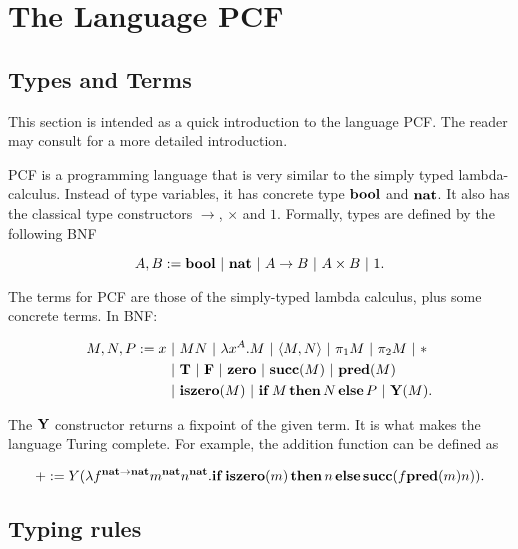 \section{The Language PCF}

\subsection{Types and Terms}

This section is intended as a quick introduction to the language PCF. The reader may consult \cite{LambdaNotes} for a more detailed introduction.

PCF is a programming language that is very similar to the simply typed lambda-calculus. Instead of type variables, it has concrete type $\mathbf{bool}$ and $\mathbf{nat}$. It also has the classical type constructors $\to$, $\times$ and $1$. Formally, types are defined by the following BNF

\[ A, B := \mathbf{bool} \ \mathbf{|}\  \mathbf{nat} \ \mathbf{|}\  A\to B \ \mathbf{|}\  A\times B \ \mathbf{|}\  1. \]

The terms for PCF are those of the simply-typed lambda calculus, plus some concrete terms. In BNF:

\begin{align*}
    M, N, P := x &\ \mathbf{|}\  MN \ \mathbf{|}\  \lambda x^A.M \ \mathbf{|}\  \langle M, N\rangle \ \mathbf{|}\  \pi_1M \ \mathbf{|}\  \pi_2M \ \mathbf{|}\  * \\
    &\ \mathbf{|}\  \mathbf{T} \ \mathbf{|}\  \mathbf{F} \ \mathbf{|}\  \mathbf{zero} \ \mathbf{|}\  \mathbf{succ}(M) \ \mathbf{|}\  \mathbf{pred}(M) \\
    &\ \mathbf{|}\  \mathbf{iszero}(M) \ \mathbf{|}\  \mathbf{if}\,M\,\mathbf{then}\,N\,\mathbf{else}\,P \ \mathbf{|}\  \mathbf{Y}(M).
\end{align*}

The $\mathbf{Y}$ constructor returns a fixpoint of the given term. It is what makes the language Turing complete. For example, the addition function can be defined as

\[ + := Y(\lambda f^{\mathbf{nat}\to\mathbf{nat}}m^\mathbf{nat}n^\mathbf{nat}.\mathbf{if}\,\mathbf{iszero}(m)\,\mathbf{then}\,n\,\mathbf{else}\,\mathbf{succ}(f \mathbf{pred}(m) n)). \]

\subsection{Typing rules}

